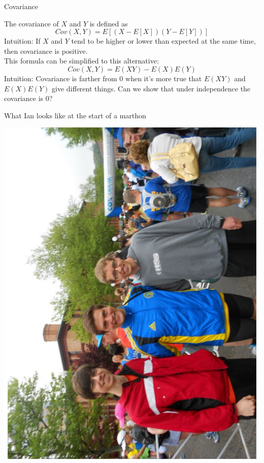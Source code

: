 \documentclass{beamer}
\begin{document}
\begin{frame}{Covariance}
\begin{definition}
The \alert{covariance} of $X$ and $Y$ is defined as
$$Cov(X,Y)=E\left[(X-E[X])(Y-E[Y])\right]$$
\alert{Intuition:} If $X$ and $Y$ tend to be higher or lower than expected at the same time, then covariance is positive. \\
This formula can be simplified to this alternative:
$$Cov(X,Y)=E(XY)-E(X)E(Y)$$
\alert{Intuition:} Covariance is farther from 0 when it's more true that $E(XY)$ and $E(X)E(Y)$ give different things. Can we show that under independence the covariance is 0?
\end{definition}
\end{frame}

\begin{frame}{What Ian looks like at the start of a marthon}
\begin{center}
\includegraphics[angle=270,scale=.3]{figures/PreMarathon.pdf}
\end{center}
\end{frame}
\end{document}
